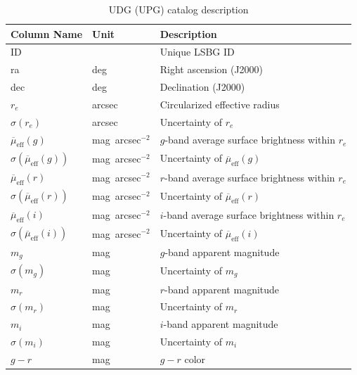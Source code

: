\documentclass[twocolumn,astrosymb,twocolappendix]{aastex631}
\newcommand{\sbunit}{mag~arcsec$^{-2}$}
\begin{document}
\begin{CJK*}{UTF8}{gbsn}
\begin{table}
\caption{UDG (UPG) catalog description} 
\label{tab:catalog}
\begin{center}
\begin{tabular}{l l l}
\hline\hline
Column Name      & Unit    & Description                    \\
\hline
ID                       &         & Unique LSBG ID \\
ra                       & deg     & Right ascension (J2000) \\
dec                      & deg     & Declination (J2000) \\
$r_e$         & arcsec  & Circularized effective radius  \\
$\sigma(r_e)$ & arcsec  & Uncertainty of $r_e$ \\
$\overline{\mu}_{\mathrm{eff}}(g)$               & \sbunit & $g$-band average surface brightness within $r_e$ \\
$\sigma(\overline{\mu}_{\mathrm{eff}}(g))$       & \sbunit & Uncertainty of $\overline{\mu}_{\mathrm{eff}}(g)$           \\
$\overline{\mu}_{\mathrm{eff}}(r)$               & \sbunit & $r$-band average surface brightness within $r_e$ \\
$\sigma(\overline{\mu}_{\mathrm{eff}}(r))$       & \sbunit & Uncertainty of $\overline{\mu}_{\mathrm{eff}}(r)$           \\
$\overline{\mu}_{\mathrm{eff}}(i)$               & \sbunit & $i$-band average surface brightness within $r_e$ \\
$\sigma(\overline{\mu}_{\mathrm{eff}}(i))$       & \sbunit & Uncertainty of $\overline{\mu}_{\mathrm{eff}}(i)$           \\
$m_g$                    & mag     & $g$-band apparent magnitude     \\
$\sigma(m_g)$            & mag     & Uncertainty of $m_g$            \\
$m_r$                    & mag     & $r$-band apparent magnitude     \\
$\sigma(m_r)$            & mag     & Uncertainty of $m_r$            \\
$m_i$                    & mag     & $i$-band apparent magnitude     \\
$\sigma(m_i)$            & mag     & Uncertainty of $m_i$            \\
$g-r$                    & mag     & $g-r$ color                     \\

\end{tabular}
\end{center}
\end{table}
\end{CJK*}
\end{document}
